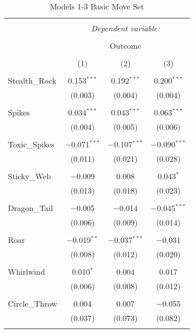 \documentclass[12pt,twoside]{reedthesis}
\begin{document}
  \begin{table}[!htbp] \centering 
    \caption{Models 1-3 Basic Move Set} 
    \label{} 
  \begin{tabular}{@{\extracolsep{5pt}}lccc} 
  \\[-1.8ex]\hline 
  \hline \\[-1.8ex] 
   & \multicolumn{3}{c}{\textit{Dependent variable:}} \\ 
  \cline{2-4} 
  \\[-1.8ex] & \multicolumn{3}{c}{Outcome} \\ 
  \\[-1.8ex] & (1) & (2) & (3)\\ 
  \hline \\[-1.8ex] 
   Stealth\_Rock & 0.153$^{***}$ & 0.192$^{***}$ & 0.200$^{***}$ \\ 
    & (0.003) & (0.004) & (0.004) \\ 
    & & & \\ 
   Spikes & 0.034$^{***}$ & 0.043$^{***}$ & 0.063$^{***}$ \\ 
    & (0.004) & (0.005) & (0.006) \\ 
    & & & \\ 
   Toxic\_Spikes & $-$0.071$^{***}$ & $-$0.107$^{***}$ & $-$0.090$^{***}$ \\ 
    & (0.011) & (0.021) & (0.028) \\ 
    & & & \\ 
   Sticky\_Web & $-$0.009 & 0.008 & 0.043$^{*}$ \\ 
    & (0.013) & (0.018) & (0.023) \\ 
    & & & \\ 
   Dragon\_Tail & $-$0.005 & $-$0.014 & $-$0.045$^{***}$ \\ 
    & (0.006) & (0.009) & (0.014) \\ 
    & & & \\ 
   Roar & $-$0.019$^{**}$ & $-$0.037$^{***}$ & $-$0.031 \\ 
    & (0.008) & (0.012) & (0.020) \\ 
    & & & \\ 
   Whirlwind & 0.010$^{*}$ & 0.004 & 0.017 \\ 
    & (0.006) & (0.008) & (0.012) \\ 
    & & & \\ 
   Circle\_Throw & 0.004 & 0.007 & $-$0.055 \\ 
    & (0.037) & (0.073) & (0.082) \\ 
    & & & \\ 

\end{tabular}
\end{table}
\end{document}
